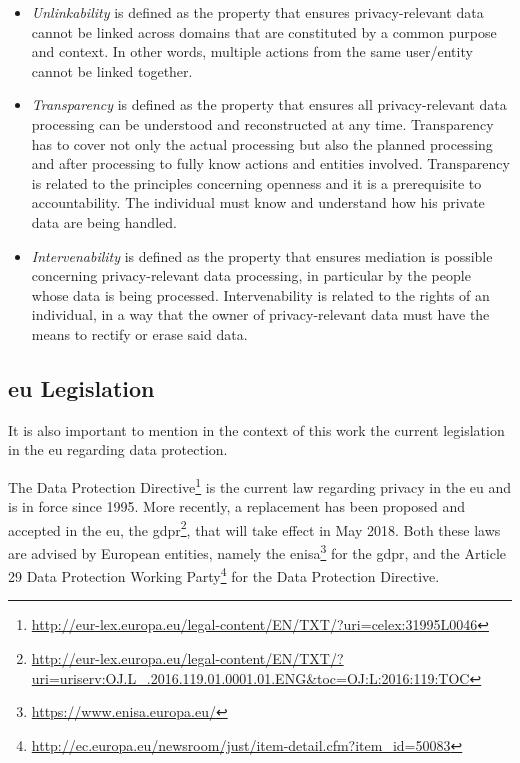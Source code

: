 \begin{itemize}
\item \textit{Unlinkability} is defined as the property that ensures privacy-relevant data cannot be linked across domains that are constituted by a common purpose and context. In other words, multiple actions from the same user/entity cannot be linked together.
\item \textit{Transparency} is defined as the property that ensures all privacy-relevant data processing can be understood and reconstructed at any time. Transparency has to cover not only the actual processing but also the planned processing and after processing to fully know actions and entities involved. Transparency is related to the principles concerning openness and it is a prerequisite to accountability. The individual must know and understand how his private data are being handled.
\item \textit{Intervenability} is defined as the property that ensures mediation is possible concerning privacy-relevant data processing, in particular by the people whose data is being processed. Intervenability is related to the rights of an individual, in a way that the owner of privacy-relevant data must have the means to rectify or erase said data.

\end{itemize}


\subsection{\acl{eu} Legislation}
\label{ssec:EuropeanUnionLegislation}

It is also important to mention in the context of this work the current legislation in the \ac{eu} regarding data protection.

 The Data Protection Directive\footnote{\url{http://eur-lex.europa.eu/legal-content/EN/TXT/?uri=celex:31995L0046}} is the current law regarding privacy in the \ac{eu} and is in force since 1995.
More recently, a replacement has been proposed and accepted in the \ac{eu}, the \ac{gdpr}\footnote{\url{http://eur-lex.europa.eu/legal-content/EN/TXT/?uri=uriserv:OJ.L_.2016.119.01.0001.01.ENG&toc=OJ:L:2016:119:TOC}}, that will take effect in May 2018. Both these laws are advised by European entities, namely the \ac{enisa}\footnote{\url{https://www.enisa.europa.eu/}} for the \ac{gdpr}, and the Article 29 Data Protection Working Party\footnote{\url{http://ec.europa.eu/newsroom/just/item-detail.cfm?item_id=50083}} for the Data Protection Directive.


